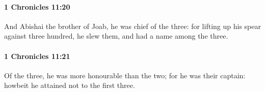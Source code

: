 		\paragraph{1 Chronicles 11:20} %
			\label{1CHRONICLES-11-20}

			And Abishai the brother of Joab, he was chief of the three: for lifting up his spear against three hundred, he slew them, and had a name among the three.


		\paragraph{1 Chronicles 11:21} %
			\label{1CHRONICLES-11-21}

			Of the three, he was more honourable than the two; for he was their captain: howbeit he attained not to the first three.


